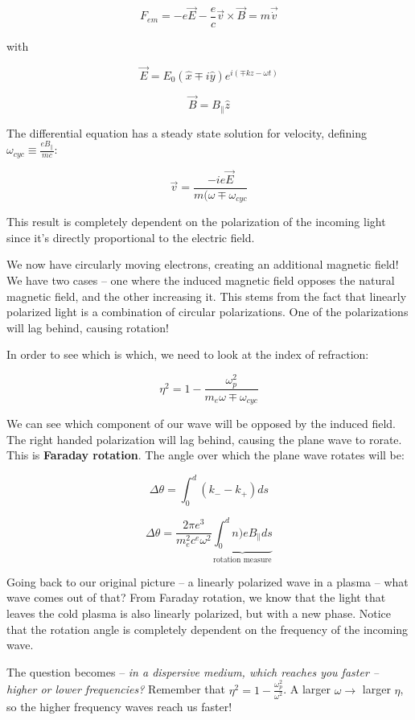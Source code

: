 \documentclass{article}
\def\Bfield{{\vec{B}}}
\def\Efield{{\vec {E}}}
\def\bfield{{\vec B}}
\begin{document}
$$
F_{em} = -e\Efield -\frac{e}{c} \vec{v}\times \bfield = m \vec{\dot{v}}
$$

with 

$$
\Efield = E_0 (\hat{x} \mp i\hat{y})e^{i(\mp k z - \omega t)}
$$

$$
\Bfield = B_\parallel \hat{z}
$$

The differential equation has a steady state solution for velocity, defining $\omega_{cyc} \equiv \frac{e B_\parallel}{mc}$:

$$
\boxed{\vec{v} = \frac{-ie\vec{E}}{m(\omega \mp \omega_{cyc}}}
$$

This result is completely dependent on the polarization of the incoming light since it's directly proportional to the electric field. 

We now have circularly moving electrons, creating an additional magnetic field! We have two cases -- one where the induced magnetic field opposes the natural magnetic field, and the other increasing it. This stems from the fact that linearly polarized light is a combination of circular polarizations. One of the polarizations will lag behind, causing rotation!

In order to see which is which, we need to look at the index of refraction:

$$
\eta^2 =1 - \frac{\omega_p^2}{m_e{\omega\mp\omega_{cyc}}}
$$

We can see which component of our wave will be opposed by the induced field. The right handed polarization will lag behind, causing the plane wave to rorate. This is \textbf{Faraday rotation}. The angle over which the plane wave rotates will be: 

$$
\Delta \theta = \int_0^d \left(k_- - k_+\right) ds 
$$

$$
\Delta \theta = \frac{2\pi e^3}{m_e^2 c^e \omega^2} \underbrace{\int_0^d  n)e B_\parallel ds}_\text{rotation measure}
$$

Going back to our original picture -- a linearly polarized wave in a plasma -- what wave comes out of that? From Faraday rotation, we know that the light that leaves the cold plasma is also linearly polarized, but with a new phase. Notice that the rotation angle is completely dependent on the frequency of the incoming wave. 

The question becomes -- \textit{in a dispersive medium, which reaches you faster -- higher or lower frequencies?} Remember that $\eta^2 = 1 - \frac{\omega_p^2}{\omega^2}$. A larger $\omega \rightarrow$ larger $\eta$, so the higher frequency waves reach us faster!
\end{document}
